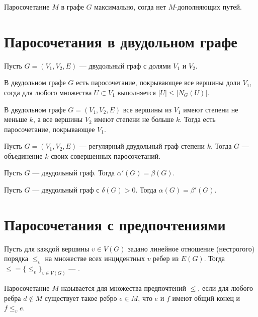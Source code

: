\begin{theorem}[Берж, 1957]
	Паросочетание $M$ в графе $G$ максимально, согда нет $M$-дополняющих путей.
\end{theorem}

\section{Паросочетания в двудольном графе}
Пусть $G = (V_1, V_2, E)$ --- двудольный граф с долями $V_1$ и $V_2$.
\begin{theorem}[Холл, 1935]
	В двудольном графе $G$ есть  паросочетание, покрывающее все вершины доли $V_1$, согда для любого множества $U \subset V_1$ выполняется $ \lvert U \rvert \le \lvert N_{G}(U) \rvert$.
\end{theorem}

\begin{corollary}[]
	В двудольном графе $G = (V_1, V_2, E)$ все вершины из $V_1$ имеют степени не меньше $k$, а все вершины $V_2$ имеют степени не больше $k$. Тогда есть паросочетание, покрывающее $V_1$.
\end{corollary}

\begin{corollary}[Кенинг, 1916]
	Пусть $G = (V_1, V_2, E)$ --- регулярный двудольный граф степени $k$. Тогда $G$ --- объединение $k$ своих совершенных паросочетаний.
\end{corollary}

\begin{theorem}[Кенинг, 1931]
	Пусть $G$ --- двудольный граф. Тогда $\alpha'(G) = \beta(G)$.
\end{theorem}

\begin{corollary}[]
	Пусть $G$ --- двудольный граф с $\delta(G) >0$. Тогда $\alpha(G) = \beta'(G)$.
\end{corollary}

\section{Паросочетания с предпочтениями}
\begin{definition}[]
	Пусть для каждой вершины $v \in V(G)$ задано линейное отношение (нестрогого) порядка $\le_{v}$ на множестве всех инцидентных  $v$ ребер из $E(G)$. Тогда $\le = \{\le_v\}_{v \in  V(G)}$ --- .
\end{definition}
\begin{definition}[]
	Паросочетание $M$ называется  для множества предпочтений $\le$, если для любого ребра $d \not \in M$ существует такое ребро $e \in M$, что $e$ и $f$ имеют общий конец и $f \le _{v} e$.
\end{definition}

